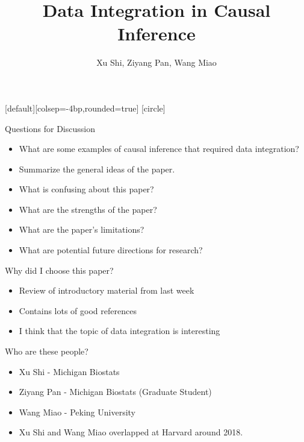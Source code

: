 \documentclass[handout]{beamer} %
\author{Xu Shi, Ziyang Pan, Wang Miao}
\title{Data Integration in Causal Inference}
\begin{document}
\everymath{\displaystyle}
[default][colsep=-4bp,rounded=true]
[circle]
\frame{\titlepage}

%
%

\begin{frame}{Questions for Discussion}

\begin{itemize}
    \item What are some examples of causal inference that required data 
      integration?
    \item Summarize the general ideas of the paper.
    \item What is confusing about this paper?
    \item What are the strengths of the paper?
    \item What are the paper's limitations?
    \item What are potential future directions for research?
\end{itemize}

\end{frame}

\begin{frame}{Why did I choose this paper?}

\begin{itemize}
  \item Review of introductory material from last week
  \item Contains lots of good references
  \item I think that the topic of data integration is interesting
\end{itemize}

\end{frame}

\begin{frame}{Who are these people?}

  \begin{itemize}
    \item Xu Shi - Michigan Biostats
    \item Ziyang Pan - Michigan Biostats (Graduate Student)
    \item Wang Miao - Peking University
    \item Xu Shi and Wang Miao overlapped at Harvard around 2018.
  \end{itemize}

\end{frame}
\end{document}
